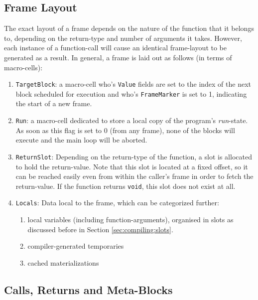 \subsection{Frame Layout}
The exact layout of a frame depends on the nature of the function that it belongs to, depending on the return-type and number of arguments it takes. However, each instance of a function-call will cause an identical frame-layout to be generated as a result. In general, a frame is laid out as follows (in terms of macro-cells):
\begin{enumerate}
\item \texttt{TargetBlock}: a macro-cell who's \texttt{Value} fields are set to the index of the next block scheduled for execution and who's \texttt{FrameMarker} is set to 1, indicating the start of a new frame.
\item \texttt{Run}: a macro-cell dedicated to store a local copy of the program's \emph{run}-state. As soon as this flag is set to 0 (from any frame), none of the blocks will execute and the main loop will be aborted.
\item \texttt{ReturnSlot}: Depending on the return-type of the function, a slot is allocated to hold the return-value. Note that this slot is located at a fixed offset, so it can be reached easily even from within the caller's frame in order to fetch the return-value. If the function returns \texttt{void}, this slot does not exist at all.
\item \texttt{Locals}: Data local to the frame, which can be categorized further:
  \begin{enumerate}
  \item local variables (including function-arguments), organised in slots as discussed before in Section \ref{sec:compiling:slots}.
  \item compiler-generated temporaries
  \item cached materializations
  \end{enumerate}
\end{enumerate}

\subsection{Calls, Returns and Meta-Blocks}
